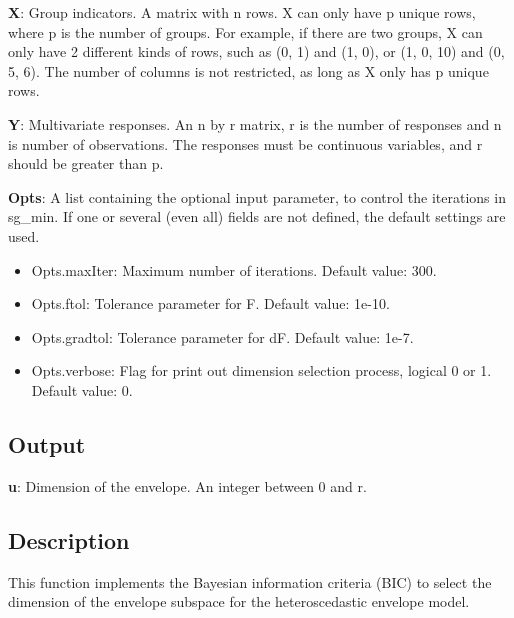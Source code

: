 \documentclass[a4paper,11pt,openany]{memoir}
\begin{document}
\begin{par}
\textbf{X}: Group indicators. A matrix with n rows.  X can only have p unique  rows, where p is the number of groups. For example, if there are two groups, X can only have 2 different kinds of rows, such as (0, 1) and (1, 0), or (1, 0, 10) and (0, 5, 6).  The number of columns is not restricted, as long as X only has p unique rows.
\end{par} \vspace{1em}
\begin{par}
\textbf{Y}: Multivariate responses. An n by r matrix, r is the number of responses and n is number of observations. The responses must be continuous variables, and r should be greater than p.
\end{par} \vspace{1em}
\begin{par}
\textbf{Opts}: A list containing the optional input parameter, to control the iterations in sg\_min. If one or several (even all) fields are not defined, the default settings are used.
\end{par} \vspace{1em}
\begin{itemize}
\setlength{\itemsep}{-1ex}
   \item Opts.maxIter: Maximum number of iterations.  Default value: 300.
   \item Opts.ftol: Tolerance parameter for F.  Default value: 1e-10.
   \item Opts.gradtol: Tolerance parameter for dF.  Default value: 1e-7.
   \item Opts.verbose: Flag for print out dimension selection process, logical 0 or 1. Default value: 0.
\end{itemize}


\subsection*{Output}

\begin{par}
\textbf{u}: Dimension of the envelope. An integer between 0 and r.
\end{par} \vspace{1em}


\subsection*{Description}

\begin{par}
This function implements the Bayesian information criteria (BIC) to select the dimension of the envelope subspace for the heteroscedastic envelope model.
\end{par} \vspace{1em}
\end{document}
